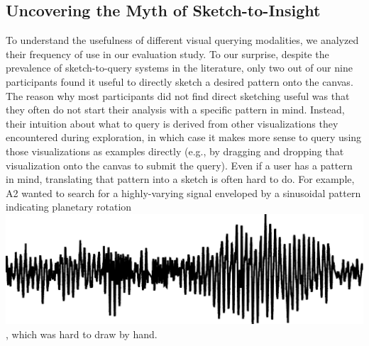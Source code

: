  \subsection{Uncovering the Myth of Sketch-to-Insight}
 \par To understand the usefulness of different visual querying modalities, we analyzed their frequency of use in our evaluation study. To our surprise,
 despite the prevalence of sketch-to-query
 systems in the literature,  only two out of our nine participants
 found it useful to directly
 sketch a desired pattern onto the canvas. %
 The reason why most participants
 did not find direct sketching useful was that
 they often do not start their analysis with a specific pattern in mind.
 Instead, their intuition about what to query is derived
 from other visualizations they encountered
 during exploration, in which case it makes
 more sense to query using those visualizations
 as examples directly (e.g., by dragging and dropping
 that visualization onto the canvas to submit the query).
 Even if a user has a pattern in mind,
 translating that pattern into a sketch is often hard
 to do. For example,
 A2 wanted to search for a highly-varying signal
 enveloped by a sinusoidal pattern indicating
 planetary rotation \includegraphics[width=2\baselineskip,keepaspectratio]{figures/impossible_sketch.png}, which was hard to draw by hand.
